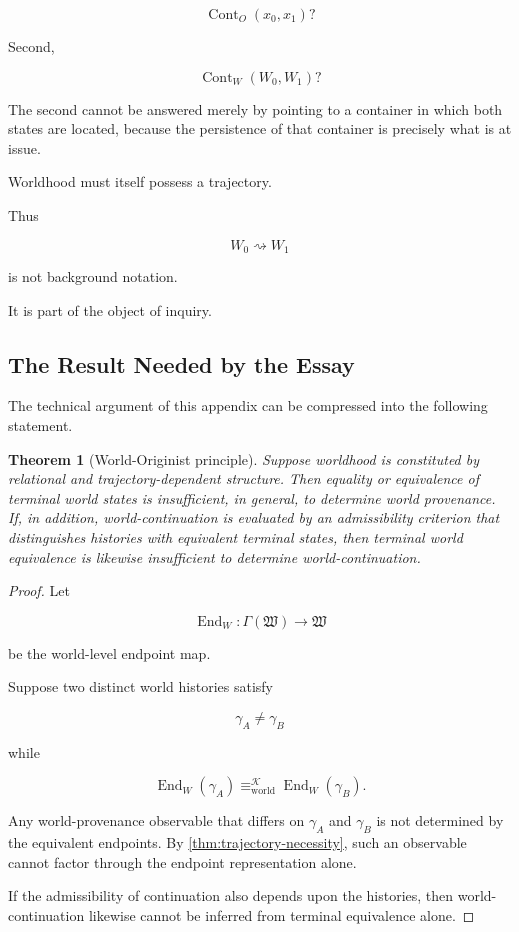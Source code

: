 \documentclass[
  11pt,
  a4paper,
  DIV=12,
  BCOR=0mm,
  parskip=half-
]{scrartcl}
\newcommand{\eqworld}{%
  \equiv_{\mathrm{world}}%
}
\newcommand{\End}{\operatorname{End}}
\newcommand{\Cont}{\operatorname{Cont}}
\newcommand{\leadsto}{\rightsquigarrow}
\theoremstyle{definition}
\theoremstyle{plain}
\newtheorem{theorem}[definition]{Theorem}
\theoremstyle{remark}
\begin{document}
\[
  \Cont_O(x_0,x_1)?
\]

Second,

\[
  \Cont_W(W_0,W_1)?
\]

The second cannot be answered merely by pointing to a container in which both
states are located, because the persistence of that container is precisely
what is at issue.

Worldhood must itself possess a trajectory.

Thus

\[
  W_0
  \leadsto
  W_1
\]

is not background notation.

It is part of the object of inquiry.


\subsection{The Result Needed by the Essay}
\label{app:world-originist-principle}

The technical argument of this appendix can be compressed into the following
statement.

\begin{theorem}[World-Originist principle]
\label{thm:world-originist}
Suppose worldhood is constituted by relational and trajectory-dependent
structure. Then equality or equivalence of terminal world states is
insufficient, in general, to determine world provenance. If, in addition,
world-continuation is evaluated by an admissibility criterion that
distinguishes histories with equivalent terminal states, then terminal
world equivalence is likewise insufficient to determine world-continuation.
\end{theorem}

\begin{proof}
Let

\[
  \End_W:
  \Gamma(\mathfrak W)
  \to
  \mathfrak W
\]

be the world-level endpoint map.

Suppose two distinct world histories satisfy

\[
  \gamma_A\neq\gamma_B
\]

while

\[
  \End_W(\gamma_A)
  \eqworld^{\mathcal K}
  \End_W(\gamma_B).
\]

Any world-provenance observable that differs on \(\gamma_A\) and \(\gamma_B\)
is not determined by the equivalent endpoints. By
\cref{thm:trajectory-necessity}, such an observable cannot factor through the
endpoint representation alone.

If the admissibility of continuation also depends upon the histories, then
world-continuation likewise cannot be inferred from terminal equivalence
alone.
\end{proof}
\end{document}
